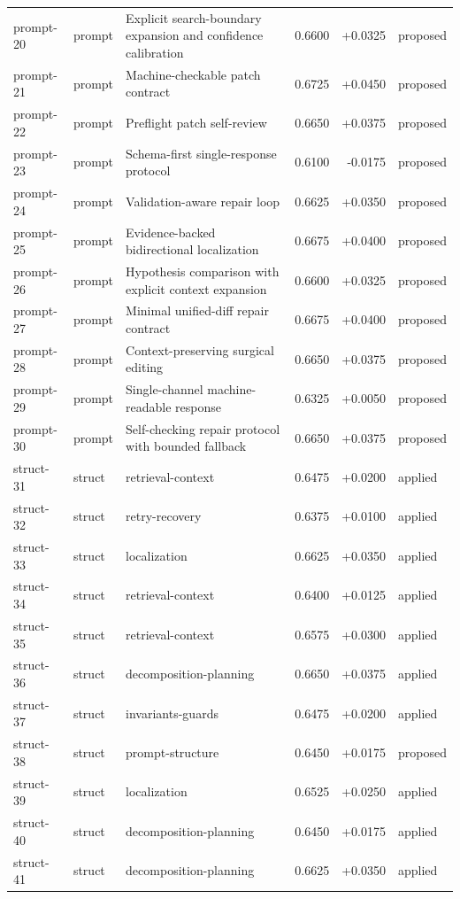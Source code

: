 \begin{center}
\begin{longtable}{llp{5.2cm}rrl}
prompt-20 & prompt & Explicit search-boundary expansion and confidence calibration & 0.6600 & +0.0325 & proposed \\
prompt-21 & prompt & Machine-checkable patch contract & 0.6725 & +0.0450 & proposed \\
prompt-22 & prompt & Preflight patch self-review & 0.6650 & +0.0375 & proposed \\
prompt-23 & prompt & Schema-first single-response protocol & 0.6100 & -0.0175 & proposed \\
prompt-24 & prompt & Validation-aware repair loop & 0.6625 & +0.0350 & proposed \\
prompt-25 & prompt & Evidence-backed bidirectional localization & 0.6675 & +0.0400 & proposed \\
prompt-26 & prompt & Hypothesis comparison with explicit context expansion & 0.6600 & +0.0325 & proposed \\
prompt-27 & prompt & Minimal unified-diff repair contract & 0.6675 & +0.0400 & proposed \\
prompt-28 & prompt & Context-preserving surgical editing & 0.6650 & +0.0375 & proposed \\
prompt-29 & prompt & Single-channel machine-readable response & 0.6325 & +0.0050 & proposed \\
prompt-30 & prompt & Self-checking repair protocol with bounded fallback & 0.6650 & +0.0375 & proposed \\
struct-31 & struct & retrieval-context & 0.6475 & +0.0200 & applied \\
struct-32 & struct & retry-recovery & 0.6375 & +0.0100 & applied \\
struct-33 & struct & localization & 0.6625 & +0.0350 & applied \\
struct-34 & struct & retrieval-context & 0.6400 & +0.0125 & applied \\
struct-35 & struct & retrieval-context & 0.6575 & +0.0300 & applied \\
struct-36 & struct & decomposition-planning & 0.6650 & +0.0375 & applied \\
struct-37 & struct & invariants-guards & 0.6475 & +0.0200 & applied \\
struct-38 & struct & prompt-structure & 0.6450 & +0.0175 & proposed \\
struct-39 & struct & localization & 0.6525 & +0.0250 & applied \\
struct-40 & struct & decomposition-planning & 0.6450 & +0.0175 & applied \\
struct-41 & struct & decomposition-planning & 0.6625 & +0.0350 & applied \\

\end{longtable}
\end{center}
